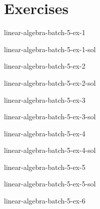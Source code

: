 \documentclass[preview]{standalone}
\begin{document}
\genpage

\section{Exercises}

\begin{snippetexercise}{linear-algebra-batch-5-ex-1}{}
    \todo
\end{snippetexercise}

\begin{snippetsolution}{linear-algebra-batch-5-ex-1-sol}{}
    \todo
\end{snippetsolution}

\begin{snippetexercise}{linear-algebra-batch-5-ex-2}{}
    \todo
\end{snippetexercise}

\begin{snippetsolution}{linear-algebra-batch-5-ex-2-sol}{}
    \todo
\end{snippetsolution}

\begin{snippetexercise}{linear-algebra-batch-5-ex-3}{}
    \todo
\end{snippetexercise}

\begin{snippetsolution}{linear-algebra-batch-5-ex-3-sol}{}
    \todo
\end{snippetsolution}

\begin{snippetexercise}{linear-algebra-batch-5-ex-4}{}
    \todo
\end{snippetexercise}

\begin{snippetsolution}{linear-algebra-batch-5-ex-4-sol}{}
    \todo
\end{snippetsolution}

\begin{snippetexercise}{linear-algebra-batch-5-ex-5}{}
    \todo
\end{snippetexercise}

\begin{snippetsolution}{linear-algebra-batch-5-ex-5-sol}{}
    \todo
\end{snippetsolution}

\begin{snippetexercise}{linear-algebra-batch-5-ex-6}{}
    \todo
\end{snippetexercise}
\end{document}
